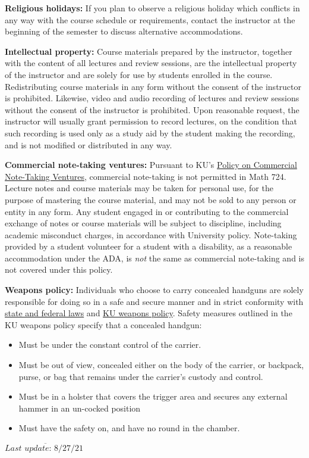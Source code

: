 \documentclass{amsart}
\newcommand{\Blue}{\color{blue}}
\begin{document}
\textbf{Religious holidays:}
  If you plan to observe a religious holiday which conflicts in any way with the course schedule or requirements, contact the instructor at the beginning of the semester to discuss alternative accommodations.

\textbf{Intellectual property:}
  Course materials prepared by the instructor, together with the content of all lectures and review sessions, are the intellectual property of 
the instructor and are solely for use by students enrolled in the course. Redistributing course materials in any form without the consent of the instructor is prohibited.  Likewise, video and audio recording of lectures and review sessions without the consent of the instructor is prohibited.  Upon reasonable request, the instructor will usually grant permission to record lectures, on the condition that such recording is used only as a study aid by the student making the recording, and is not modified or distributed in any way.

\textbf{Commercial note-taking ventures:}
  Pursuant to KU's \href{http://policy.ku.edu/provost/commercial-note-taking}{\Blue Policy on
Commercial Note-Taking Ventures}, commercial note-taking is not permitted in Math 724. Lecture notes and course materials may be taken for personal use, for the purpose of mastering the course material, and may not be sold to any person or entity in any form. Any student engaged in or contributing to the commercial exchange of notes or course materials will be subject to discipline, including academic misconduct charges, in accordance with University policy.  Note-taking provided by a student volunteer for a student with a disability, as a reasonable accommodation under the ADA, is \emph{not} the same as commercial note-taking and is not covered under this policy. 

\textbf{Weapons policy:}
  Individuals who choose to carry concealed handguns are solely responsible for doing so in a safe and secure manner and in strict conformity with \href{http://concealedcarry.ku.edu/information}{\Blue state and federal laws} and \href{http://policy.ku.edu/provost/weapons-on-campus}{\Blue KU weapons policy}. Safety measures outlined in the KU weapons policy specify that a concealed handgun:
\begin{itemize}
\item Must be under the constant control of the carrier.
\item Must be out of view, concealed either on the body of the carrier, or backpack, purse, or bag   that remains under the carrier's custody and control.   
\item Must be in a holster that covers the trigger area and secures any external hammer in an un-cocked position
\item Must have the safety on, and have no round in the chamber.
\end{itemize}

\vfill$\overline{\textit{Last update: 8/27/21\ }}$
\end{document}
